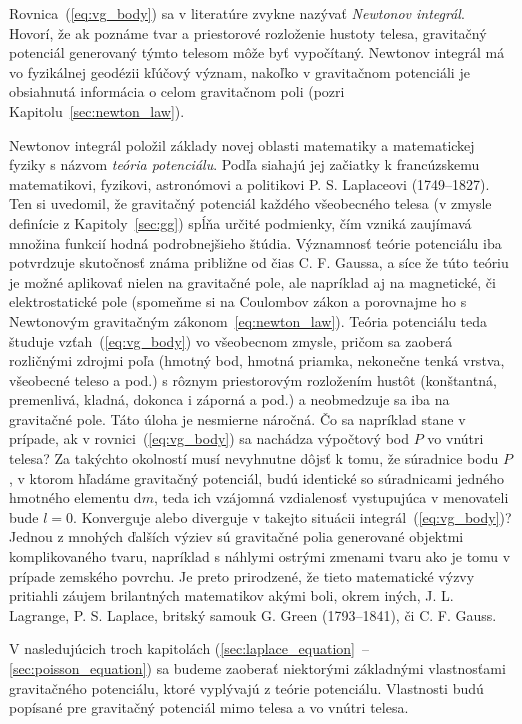 \documentclass[a4paper, 12pt]{book}
\newcommand{\diff}{\mathrm d}
\begin{document}
Rovnica~(\ref{eq:vg_body}) sa v literatúre zvykne nazývať \emph{Newtonov 
integrál}.  Hovorí, že ak poznáme tvar a priestorové rozloženie hustoty telesa, 
gravitačný potenciál generovaný týmto telesom môže byť vypočítaný.  Newtonov 
integrál má vo fyzikálnej geodézii kľúčový význam, nakoľko v gravitačnom 
potenciáli je obsiahnutá informácia o celom gravitačnom poli (pozri 
Kapitolu~\ref{sec:newton_law}).

Newtonov integrál položil základy novej oblasti matematiky a matematickej 
fyziky s názvom \emph{teória potenciálu}.  Podľa \cite{MacMillan1930} siahajú 
jej začiatky k francúzskemu matematikovi, fyzikovi, astronómovi a politikovi 
P. S. Laplaceovi (1749--1827).  Ten si uvedomil, že gravitačný potenciál 
každého všeobecného telesa (v zmysle definície z Kapitoly~\ref{sec:gg}) spĺňa 
určité podmienky, čím vzniká zaujímavá množina funkcií hodná podrobnejšieho 
štúdia.  Významnosť teórie potenciálu iba potvrdzuje skutočnosť známa približne 
od čias C. F. Gaussa, a síce že túto teóriu je možné aplikovať nielen na 
gravitačné pole, ale  napríklad aj na magnetické, či elektrostatické pole 
(spomeňme si na Coulombov zákon a porovnajme ho s Newtonovým gravitačným 
zákonom~\ref{eq:newton_law}).  Teória potenciálu teda študuje 
vzťah~(\ref{eq:vg_body}) vo všeobecnom zmysle, pričom sa zaoberá rozličnými 
zdrojmi poľa (hmotný bod, hmotná priamka, nekonečne tenká vrstva, všeobecné 
teleso a pod.) s rôznym priestorovým rozložením hustôt (konštantná, premenlivá, 
kladná, dokonca i záporná a pod.) a neobmedzuje sa iba na gravitačné pole.  
Táto úloha je nesmierne náročná.  Čo sa napríklad stane v prípade, ak 
v rovnici~(\ref{eq:vg_body}) sa nachádza výpočtový bod $P$ vo vnútri telesa?  
Za takýchto okolností musí nevyhnutne dôjsť k tomu, že súradnice bodu $P$, 
v ktorom hľadáme gravitačný potenciál, budú identické so súradnicami jedného 
hmotného elementu $\diff m$, teda ich vzájomná vzdialenosť vystupujúca 
v menovateli bude $l = 0$.  Konverguje alebo diverguje v takejto situácii 
integrál~(\ref{eq:vg_body})?  Jednou z mnohých ďalších výziev sú gravitačné 
polia generované objektmi komplikovaného tvaru, napríklad s náhlymi ostrými 
zmenami tvaru ako je tomu v prípade zemského povrchu.  Je preto prirodzené, že 
tieto matematické výzvy pritiahli záujem brilantných matematikov akými boli, 
okrem iných, J. L. Lagrange, P. S. Laplace, britský samouk G. Green 
(1793--1841), či C. F. Gauss.

V nasledujúcich troch kapitolách (\ref{sec:laplace_equation}~-- 
\ref{sec:poisson_equation}) sa budeme zaoberať niektorými základnými 
vlastnosťami gravitačného potenciálu, ktoré vyplývajú z teórie potenciálu.  
Vlastnosti budú popísané pre gravitačný potenciál mimo telesa a vo vnútri 
telesa.
\end{document}

